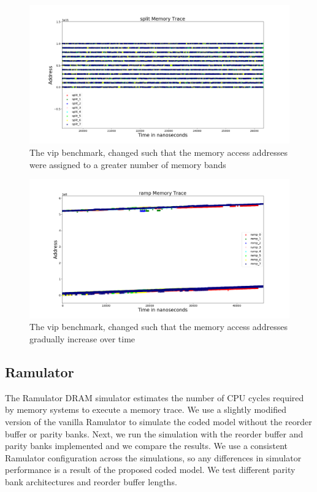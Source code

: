 \begin{figure}[h!]
		\includegraphics[width=\linewidth]{figures/vips_split.png}
		\caption{The vip benchmark, changed such that the memory access addresses were assigned to a greater number of memory bands}
		\label{fig:vips_split}
\end{figure}

\begin{figure}[h!]
		\includegraphics[width=\linewidth]{figures/vips_ramp.png}
		\caption{The vip benchmark, changed such that the memory access addresses gradually increase over time}
		\label{fig:vips_ramp}
\end{figure}

\subsection{Ramulator}
The Ramulator DRAM simulator estimates the number of CPU cycles required by memory systems to execute a memory trace\cite{Ramulator}. We use a slightly modified version of the vanilla Ramulator to simulate the coded model without the reorder buffer or parity banks. Next, we run the simulation with the reorder buffer and parity banks implemented and we compare the results. We use a consistent Ramulator configuration across the simulations, so any differences in simulator performance is a result of the proposed coded model. We test different parity bank architectures and reorder buffer lengths.

